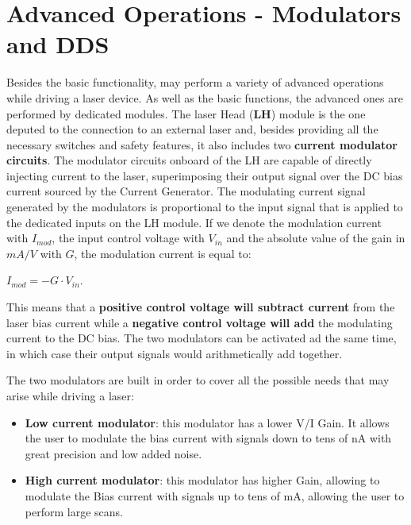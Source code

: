 \section{Advanced Operations - Modulators and DDS}   \label{DDS_main_chapter}
Besides the basic functionality, \QubeModel  may perform a variety of advanced operations while driving a laser device. As well as the basic functions, the advanced ones are performed by dedicated modules.
\newline The laser Head (\textbf{LH}) module is the one deputed to the connection to an external laser and, besides providing all the necessary switches and safety features, it also includes two \textbf{current modulator circuits}.
\newline The modulator circuits onboard of the LH are capable of directly injecting current to the laser, superimposing their output signal over the DC bias current sourced by the Current Generator.
\newline The modulating current signal generated by the modulators is proportional to the input signal that is applied to the dedicated inputs on the LH module. If we denote the modulation current with $I_{mod}$, the input control voltage with $V_{in}$ and the absolute value of the gain in $mA/V$ with $G$, the modulation current is equal to:

\begin{center}
    $I_{mod} = -G \cdot V_{in}$.
\end{center}

This means that a \textbf{positive control voltage will subtract current} from the laser bias current while a \textbf{negative control voltage will add} the modulating current to the DC bias. The two modulators can be activated ad the same time, in which case their output signals would arithmetically add together.

The two modulators are built in order to cover all the possible needs that may arise while driving a laser:
\begin{itemize}
    \item \textbf{Low current modulator}: this modulator has a lower V/I Gain. It allows the user to modulate the bias current with signals down to tens of nA with great precision and low added noise.
    \item \textbf{High current modulator}: this modulator has higher Gain, allowing to modulate the Bias current with signals up to tens of mA, allowing the user to perform large scans.
\end{itemize}

